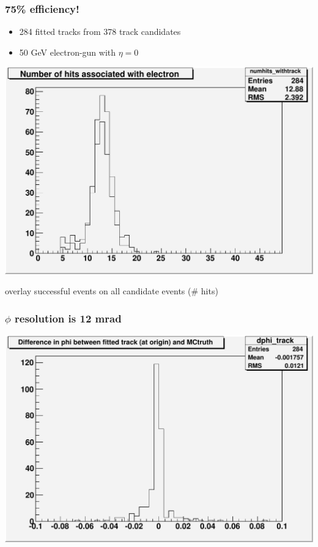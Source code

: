 \documentclass[12pt,compress]{beamer}
\begin{document}
\begin{frame}
\frametitle{75\% efficiency!}
\small
\begin{itemize}
\item 284 fitted tracks from 378 track candidates
\item 50 GeV electron-gun with $\eta = 0$
\end{itemize}
\begin{center}
\includegraphics[width=0.7\linewidth]{numhits_withtrack_overlay}

overlay successful events on all candidate events (\# hits)
\end{center}
\end{frame}

\begin{frame}
\frametitle{$\phi$ resolution is 12 mrad}
\begin{center}
\includegraphics[width=0.8\linewidth]{dphi_track}
\end{center}
\end{frame}
\end{document}
